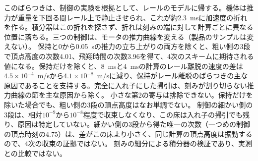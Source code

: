 \documentclass[twocolumn]{labreport}
\begin{document}
このばらつきは、制御の実験を根拠として、レールのモデルに帰する。機体は推力が重量を下回る間レール上で静止させられ、これが約2.3~msに加速度の折れを作る。積分器はこの折れを探さず、折れは刻みの端に対して計算ごとに異なる位置に落ちる。三つの制御は、モータの推力曲線を変える（製品のサンプルは変えない）。
保持と0から0.05~sの推力の立ち上がりの両方を除くと、粗い側の3段で頂点高度の次数4.01、飛翔時間の次数3.96を得て、4次のスキームに期待される値になる。保持だけを除くと、8~msと4~msの計算のレール離脱の速度の差は$4.5\times10^{-4}$~m/sから$4.1\times10^{-8}$~m/sに減り、保持がレール離脱のばらつきの主な原因であることを支持する。完全に入れ子にした掃引は、刻みが割り切らない推力曲線の節を主な原因から除く。
小さな第2の寄与は排除できない。保持だけを除いた場合でも、粗い側の3段の頂点高度はなお単調でない。
制御の細かい側の3段は、相対$10^{-9}$から$10^{-8}$程度で収束しなくなり、この床は入れ子の掃引でも残り、原因は特定していない。細かい側の3段から得た唯一の次数（一つめの制御の頂点時刻の4.75）は、差がこの床より小さく、同じ計算の頂点高度は振動するので、4次の収束の証拠ではない。
刻みの細分による積分器の検証であり、実測との比較ではない。
\end{document}
